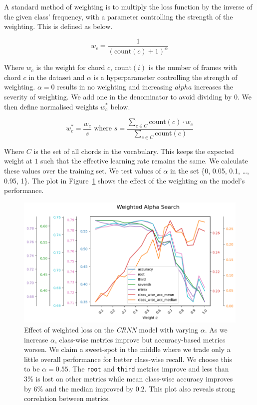 A standard method of weighting is to multiply the loss function by the inverse of the given class' frequency, with a parameter controlling the strength of the weighting. This is defined as below.

\begin{equation}
    w_c = \frac{1}{(\text{count}(c) + 1)^\alpha}
\end{equation}

Where $w_c$ is the weight for chord $c$, $\text{count}(i)$ is the number of frames with chord $c$ in the dataset and $\alpha$ is a hyperparameter controlling the strength of weighting. $\alpha=0$ results in no weighting and increasing $alpha$ increases the severity of weighting. We add one in the denominator to avoid dividing by $0$. We then define normalised weights $w_c^*$ below.

\begin{equation}\label{eq:weighted_loss}
    w_c^* = \frac{w_c}{s} \text{ where } s = \frac{\sum_{c\in C} \text{count}(c)\cdot w_c}{\sum_{c\in C} \text{count}(c)}
\end{equation}

Where $C$ is the set of all chords in the vocabulary. This keeps the expected weight at $1$ such that the effective learning rate remains the same. We calculate these values over the training set. We test values of $\alpha$ in the set \{0, 0.05, 0.1, \ldots, 0.95, 1\}. The plot in Figure~\ref{fig:weighted_loss} shows the effect of the weighting on the model's performance.

\begin{figure}[H]
    \centering
    \includegraphics[width=1.0\textwidth]{figures/weight_alpha_search.png}
    \caption{Effect of weighted loss on the \emph{CRNN} model with varying $\alpha$. As we increase $\alpha$, class-wise metrics improve but accuracy-based metrics worsen. We claim a sweet-spot in the middle where we trade only a little overall performance for better class-wise recall. We choose this to be $\alpha = 0.55$. The \texttt{root} and \texttt{third} metrics improve and less than $3\%$ is lost on other metrics while mean class-wise accuracy improves by $6\%$ and the median improved by $0.2$. This plot also reveals strong correlation between metrics. }\label{fig:weighted_loss}
\end{figure}

